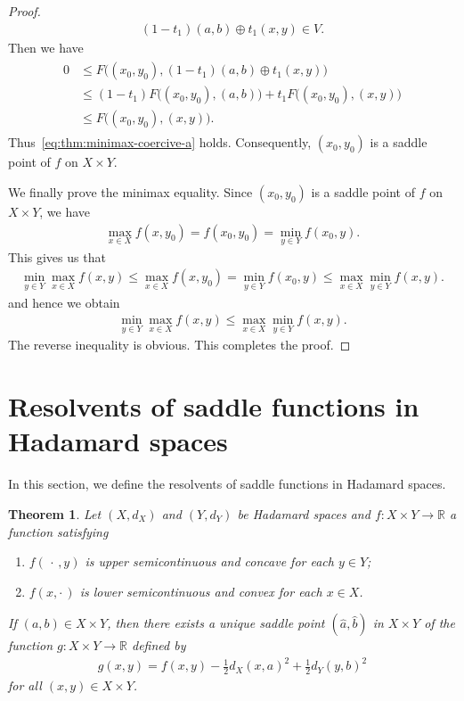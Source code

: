 \documentclass[draft]{amsart}
\numberwithin{equation}{section}
\def\R{\mathbb R}
\theoremstyle{plain}
\newtheorem{theorem}{Theorem}[section]
\theoremstyle{definition}
\theoremstyle{remark}
\begin{document}
\begin{proof}
 \begin{align}
  (1-t_1) (a,b) \oplus t_1 (x,y)  
  \in V. 
 \end{align}
 Then we have 
 \begin{align}
 \begin{split}
  0 
  &\leq F\bigl((x_0,y_0), (1-t_1) (a,b) \oplus t_1 (x,y) \bigr) \\
  &\leq (1-t_1)F\bigl((x_0,y_0), (a,b) \bigr) 
 + t_1 F\bigl((x_0,y_0), (x,y) \bigr) \\
  &\leq  F\bigl((x_0,y_0), (x,y) \bigr).   
 \end{split}
 \end{align}
 Thus~\eqref{eq:thm:minimax-coercive-a} holds. 
 Consequently, $(x_0,y_0)$ is a saddle point of $f$ on $X\times Y$. 

 We finally prove the minimax equality. 
 Since $(x_0,y_0)$ is a saddle point of $f$ on $X\times Y$, we have 
 \begin{align}
  \max_{x\in X}f(x,y_0) = f(x_0,y_0) = \min_{y\in Y} f(x_0,y). 
 \end{align}
 This gives us that 
 \begin{align}
  \min_{y\in Y}\max_{x\in X}f(x,y)
  \leq \max_{x\in X}f(x,y_0) = 
  \min_{y\in Y} f(x_0,y)
  \leq \max_{x\in X}\min_{y\in Y} f(x,y). 
 \end{align}
 and hence we obtain 
 \begin{align}
  \min_{y\in Y}\max_{x\in X}f(x,y)
  \leq \max_{x\in X}\min_{y\in Y} f(x,y). 
 \end{align}
 The reverse inequality is obvious. This completes the proof. 
\end{proof}

\section{Resolvents of saddle functions in Hadamard spaces}\label{sec:resolvent}

In this section, we define the resolvents of 
saddle functions in Hadamard spaces. 

\begin{theorem}\label{thm:resolvent-minimax}
 Let $(X,d_X)$ and $(Y,d_Y)$ be Hadamard spaces 
 and $f\colon X\times Y\to \R$ a function satisfying 
 \begin{enumerate}
  \item[(i)] $f(\,\cdot\,,y)$ is upper semicontinuous 
 and concave for each $y\in Y$; 
  \item[(ii)] $f(x,\cdot \,)$ is lower semicontinuous 
 and convex for each $x\in X$. 
 \end{enumerate}
 If $(a,b)\in X\times Y$, then 
 there exists a unique saddle point $(\hat{a}, \hat{b})$ 
 in $X\times Y$ of the function $g\colon X\times Y\to \R$ 
 defined by 
\begin{align}
  g(x,y)= f(x,y) - \frac{1}{2}d_X(x,a)^2 + \frac{1}{2}d_Y(y,b)^2 
\end{align}
 for all $(x,y)\in X\times Y$. 
\end{theorem}
\end{document}
